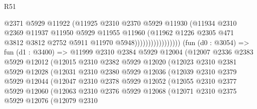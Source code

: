 \begin{lexlean}{R51}
\begin{coremodule}
                                    @2371
                                    @5929
                                    @11922
                                    (@11925
                                      @2310
                                      @2370
                                      @5929
                                      @11930
                                      (@11934
                                        @2310
                                        @2369
                                        @11937
                                        @11950
                                        @5929
                                        @11955
                                        @11960
                                        (@11962
                                          @1226
                                          @2305
                                          @471
                                          @3812
                                          @3812
                                          @2752
                                          @5911
                                          @11970
                                          @5948)))))))))))))))))
        (fun (d0 : @3054) =>
        fun (d1 : @3400) =>
        @11999
          @2310
          @2384
          @5929
          @12004
          (@12007
            @2336
            @2383
            @5929
            @12012
            (@12015
              @2310
              @2382
              @5929
              @12020
              (@12023
                @2310
                @2381
                @5929
                @12028
                (@12031
                  @2310
                  @2380
                  @5929
                  @12036
                  (@12039
                    @2310
                    @2379
                    @5929
                    @12044
                    (@12047
                      @2310
                      @2378
                      @5929
                      @12052
                      (@12055
                        @2310
                        @2377
                        @5929
                        @12060
                        (@12063
                          @2310
                          @2376
                          @5929
                          @12068
                          (@12071
                            @2310
                            @2375
                            @5929
                            @12076
                            (@12079
                              @2310

\end{coremodule}
\end{lexlean}
